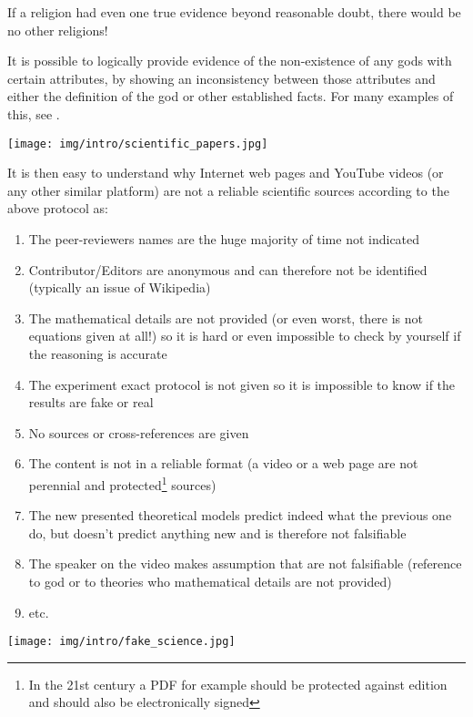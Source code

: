 	\begin{fquote}If a religion had even one true evidence beyond reasonable doubt, there would be no other religions!
 	\end{fquote}
	
	\begin{tcolorbox}[title=Remark,colframe=black,arc=10pt]
	It is possible to logically provide evidence of the non-existence of any gods with certain attributes, by showing an inconsistency between those attributes and either the definition of the god or other established facts. For many examples of this, see  \cite{martin2003impossibility}.
	\end{tcolorbox}
	
	\begin{center}
		\texttt{[image: img/intro/scientific\_papers.jpg]}
	\end{center}
	It is then easy to understand why Internet web pages and YouTube videos (or any other similar platform) are not a reliable scientific sources according to the above protocol as:
	\begin{enumerate}
	   \item The peer-reviewers names are the huge majority of time not indicated
	   
	   \item Contributor/Editors are anonymous and can therefore not be identified (typically an issue of Wikipedia)
	   
	   \item The mathematical details are not provided (or even worst, there is not equations given at all!) so it is hard or even impossible to check by yourself if the reasoning is accurate
	   
	   \item The experiment exact protocol is not given so it is impossible to know if the results are fake or real
	   
	   \item No sources or cross-references are given
	   
	   \item The content is not in a reliable format (a video or a web page are not perennial and protected\footnote{In the 21st century a PDF for example should be protected against edition and should also be electronically signed} sources)
	   
	   \item The new presented theoretical models predict indeed what the previous one do, but doesn't predict anything new and is therefore not falsifiable
	   
	   \item The speaker on the video makes assumption that are not falsifiable (reference to god or to theories who mathematical details are not provided)
	   
	   \item etc.
	\end{enumerate}
	\begin{center}
		\texttt{[image: img/intro/fake\_science.jpg]}
	\end{center}
	
